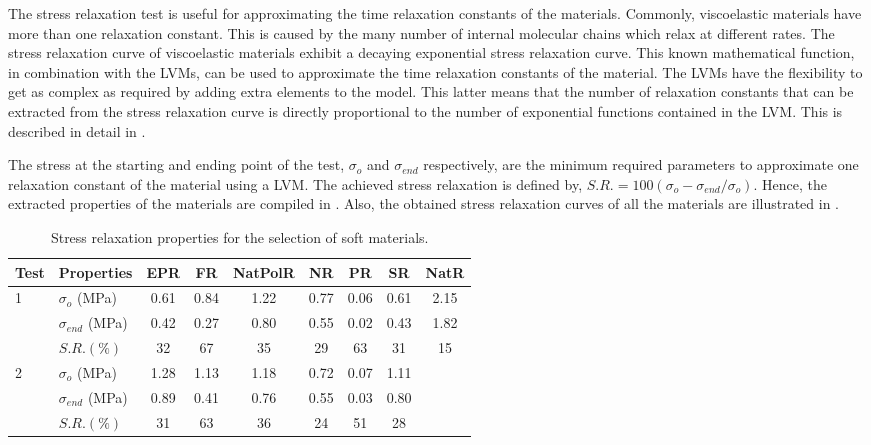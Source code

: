 The stress relaxation test is useful for approximating the time relaxation constants of the materials. Commonly, viscoelastic materials have more than one relaxation constant. This is caused by the many number of internal molecular chains which relax at different rates. The stress relaxation curve of viscoelastic materials exhibit a decaying exponential stress relaxation curve. This known mathematical function, in combination with the LVMs, can be used to approximate the time relaxation constants of the material. The LVMs have the flexibility to get as complex as required by adding extra elements to the model. This latter means that the number of relaxation constants that can be extracted from the stress relaxation curve is directly proportional to the number of exponential functions contained in the LVM. This is described in detail in .

The stress at the starting and ending point of the test,  $\sigma_o$ and $\sigma_{end}$ respectively, are the minimum required parameters to approximate one relaxation constant of the material using a LVM. The achieved stress relaxation is defined by, $S.R. = 100(\sigma_o - \sigma_{end}/\sigma_o)$. Hence, the extracted properties of the materials are compiled in . Also, the obtained stress relaxation curves of all the materials are illustrated in .

\begin{table*}[htb!]
\centering
\caption{Stress relaxation properties for the selection of soft materials.}
\label{tbl:stressRelProperties}
\begin{tabular}{llccccccc} \toprule
Test & Properties & EPR & FR & NatPolR & NR & PR & SR & NatR \\
\hline
\multirow{3}{*}{1}  & $\sigma_o$ (MPa)   & 0.61      & 0.84      & 1.22      & 0.77      & 0.06      & 0.61      & 2.15 \\
                & $\sigma_{end}$ (MPa)    & 0.42      & 0.27      & 0.80      & 0.55      & 0.02      & 0.43      & 1.82 \\
                & $S.R. (\%)$    &  32     & 67      & 35      & 29      & 63      & 31      & 15 \\
                     
\hline 
\multirow{3}{*}{2}  & $\sigma_o$ (MPa)     & 1.28      & 1.13      & 1.18      & 0.72      & 0.07      & 1.11  &         \\
                & $\sigma_{end}$ (MPa)     & 0.89      & 0.41      & 0.76      & 0.55      & 0.03      & 0.80  &          \\
                & $S.R. (\%)$     & 31      & 63      & 36      & 24      & 51      & 28  &          \\
\bottomrule
\end{tabular}
\end{table*}



